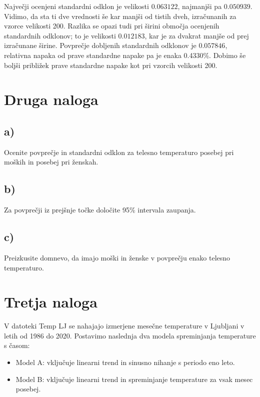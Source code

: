 \documentclass[12pt, a4paper]{article}
\begin{document}
Največji ocenjeni standardni odklon je velikosti  $0.063122$, najmanjši pa
$0.050939$. Vidimo, da sta ti dve vrednosti še kar manjši od tistih dveh, izračunanih
za vzorce velikosti 200. Razlika se opazi tudi pri širini območja ocenjenih 
standardnih odklonov; to je velikosti $0.012183$, kar je za dvakrat manjše od
prej izračunane širine. Povprečje dobljenih standardnih odklonov je $0.057846$, relativna 
napaka od prave standardne napake pa je enaka 0.4330\%. Dobimo še boljši približek 
prave standardne napake kot pri vzorcih velikosti 200.



\section*{Druga naloga}

\subsection*{a)}
Ocenite povprečje in standardni odklon za telesno temperaturo posebej pri
moških in posebej pri ženskah.

\subsection*{b)}
Za povprečji iz prejšnje točke določite 95\% intervala zaupanja.

\subsection*{c)}
Preizkusite domnevo, da imajo moški in ženske v povprečju enako telesno 
temperaturo.



\section*{Tretja naloga}

V datoteki Temp LJ se nahajajo izmerjene mesečne temperature v Ljubljani v 
letih od 1986 do 2020. Postavimo naslednja dva modela spreminjanja temperature
s časom: 

\begin{itemize}
     
    \item Model A: vključuje linearni trend in sinusno nihanje s periodo eno 
        leto.
    \item Model B: vključuje linearni trend in spreminjanje temperature za 
        vsak mesec posebej.

\end{itemize}
\end{document}
